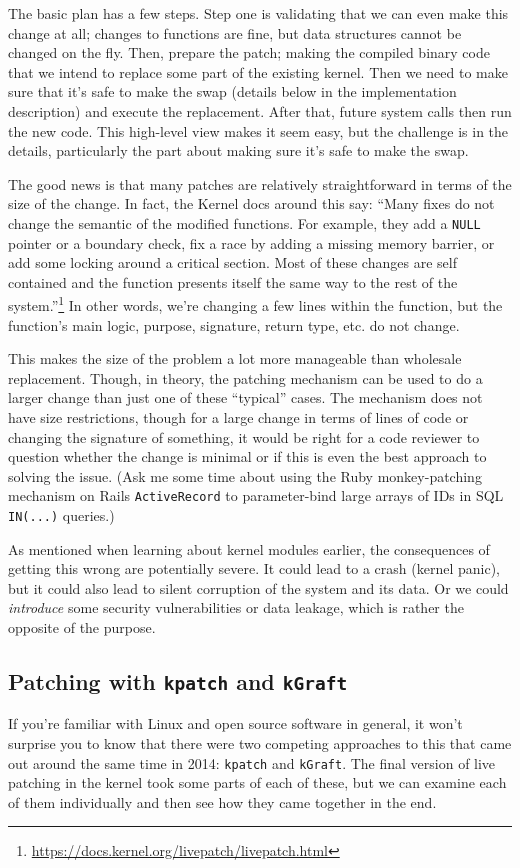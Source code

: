 The basic plan has a few steps. Step one is validating that we can even make this change at all; changes to functions are fine, but data structures cannot be changed on the fly. Then, prepare the patch; making the compiled binary code that we intend to replace some part of the existing kernel. Then we need to make sure that it's safe to make the swap (details below in the implementation description) and execute the replacement. After that, future system calls then run the new code. This high-level view makes it seem easy, but the challenge is in the details, particularly the part about making sure it's safe to make the swap.

The good news is that many patches are relatively straightforward in terms of the size of the change. In fact, the Kernel docs around this say: ``Many fixes do not change the semantic of the modified functions. For example, they add a \texttt{NULL} pointer or a boundary check, fix a race by adding a missing memory barrier, or add some locking around a critical section. Most of these changes are self contained and the function presents itself the same way to the rest of the system.''\footnote{ \url{https://docs.kernel.org/livepatch/livepatch.html} } In other words, we're changing a few lines within the function, but the function's main logic, purpose, signature, return type, etc. do not change. 

This makes the size of the problem a lot more manageable than wholesale replacement. Though, in theory, the patching mechanism can be used to do a larger change than just one of these ``typical'' cases. The mechanism does not have size restrictions, though for a large change in terms of lines of code or changing the signature of something, it would be right for a code reviewer to question whether the change is minimal or if this is even the best approach to solving the issue. (Ask me some time about using the Ruby monkey-patching mechanism on Rails \texttt{ActiveRecord} to parameter-bind large arrays of IDs in SQL \texttt{IN(...)} queries.)

As mentioned when learning about kernel modules earlier, the consequences of getting this wrong are potentially severe. It could lead to a crash (kernel panic), but it could also lead to silent corruption of the system and its data. Or we could \textit{introduce} some security vulnerabilities or data leakage, which is rather the opposite of the purpose. 


\subsection*{Patching with \texttt{kpatch} and \texttt{kGraft}}
If you're familiar with Linux and open source software in general, it won't surprise you to know that there were two competing approaches to this that came out around the same time in 2014: \texttt{kpatch} and \texttt{kGraft}. The final version of live patching in the kernel took some parts of each of these, but we can examine each of them individually and then see how they came together in the end.

